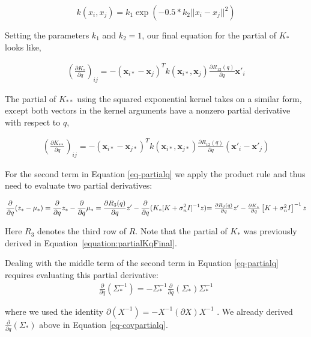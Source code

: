 \documentclass{article} %
\begin{document}
\begin{equation}
k(x_i,x_j) = k_1\exp(-0.5*k_2||x_i-x_j||^2)
\end{equation}

Setting the parameters $k_1$ and $k_2 = 1$, our final equation for the partial of $K_*$ looks like,

\begin{eqnarray}
\left(\frac{\partial K_*}{\partial q}\right)_{ij} = -(\mathbf{x}_{i*} - \mathbf{x}_j)^T k(\mathbf{x}_{i*}, \mathbf{x}_j) \frac{ \partial R_{12}(q)}{\partial q} \mathbf{x}'_i
\label{equation:partialKqFinal}
\end{eqnarray}

The partial of $K_{**}$ using the squared exponential kernel takes on a similar form, except both vectors in the kernel arguments have a nonzero partial derivative with respect to $q$,

\begin{eqnarray}
\left(\frac{\partial K_{**}}{\partial q}\right)_{ij} = -(\mathbf{x}_{i*} - \mathbf{x}_{j*})^T k(\mathbf{x}_{i*}, \mathbf{x}_{j*}) \frac{ \partial R_{12}(q)}{\partial q} (\mathbf{x}'_i - \mathbf{x}'_j)
\label{equation:partialKstarstarqFinal}
\end{eqnarray}

For the second term in Equation \ref{eq-partialq} we apply the product rule and thus need to evaluate two partial derivatives:

\begin{equation}
\frac{\partial}{\partial q} (z_* - \mu_*) = \frac{\partial}{\partial q} z_* - \frac{\partial}{\partial q} \mu_*
=  \frac{\partial R_3(q)}{\partial q}z' - \frac{\partial}{\partial q} (K_*[K + \sigma_n^2 I]^{-1} z)$$
$$= \frac{\partial R_3(q)}{\partial q}z' - \frac{\partial K_*}{\partial q} \left[K + \sigma_n^2 I\right]^{-1} z
\end{equation}

Here $R_3$ denotes the third row of $R$. Note that the partial of $K_*$ was previously derived in Equation~\ref{equation:partialKqFinal}.

Dealing with the middle term of the second term in Equation \ref{eq-partialq} requires evaluating this partial derivative:
\begin{eqnarray*}
\frac{\partial}{\partial q} \left(\Sigma_*^{-1}\right) = -\Sigma_*^{-1} \frac{\partial}{\partial q}\left(\Sigma_*\right) \Sigma_*^{-1}
\end{eqnarray*}

where we used the identity $\partial(X^{-1}) = - X^{-1} (\partial X) X^{-1}$ \cite{petersen2008matrix}. We already derived $\frac{\partial}{\partial q} (\Sigma_*)$ above in Equation \ref{eq-covpartialq}.
\end{document}
